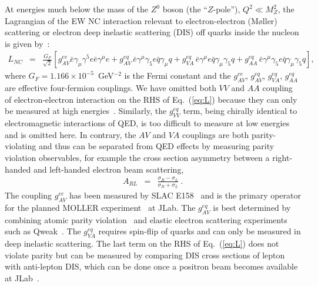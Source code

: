At energies much below the mass of the $Z^0$ boson (the ``$Z$-pole''), $Q^2\ll M_Z^2$, the Lagrangian of the EW NC interaction relevant to electron-electron (M\o ller) scattering or electron deep inelastic scattering (DIS) off quarks inside the nucleon is given by~\cite{Zyla:2020zbs}:
\begin{eqnarray}
L_{NC} &=& \frac{G_F}{\sqrt{2}} \left[ g_{AV}^{ee}\bar e\gamma_\mu\gamma^5 e\bar e\gamma^\mu e+ 
g_{AV}^{eq} \, \bar e\gamma^\mu\gamma_5 e \bar q\gamma_\mu q 
+ g_{VA}^{eq} \, \bar e\gamma^\mu e \bar q\gamma_\mu \gamma_5 q + 
g_{AA}^{eq} \, \bar e\gamma^\mu \gamma_5 e \bar q\gamma_\mu \gamma_5 q \right], \label{eq:L}
\end{eqnarray}
where $G_F=1.166\times 10^{-5}$~GeV$^{-2}$ is the Fermi constant and the $g^{ee}_{AV}$, $g^{eq}_{AV}$, $g^{eq}_{VA}$, $g^{eq}_{AA}$ are effective four-fermion couplings. 
We have omitted both $VV$ and $AA$ coupling of electron-electron interaction on the RHS of Eq.~(\ref{eq:L}) because they can only be measured at high energies~\cite{ALEPH:2005ab,Schael:2013ita}. Similarly, the $g_{VV}^{eq}$ term, being chirally identical to electromagnetic interactions of QED, is too difficult to measure at low energies and is omitted here. 
In contrary, the $AV$ and $VA$ couplings are both parity-violating and thus can be separated from QED effects by measuring parity violation observables, for example the cross section asymmetry between a right-handed and left-handed electron beam scattering, 
\begin{eqnarray}
  A_{RL} &=& \frac{\sigma_R-\sigma_L}{\sigma_R+\sigma_L}~. 
\end{eqnarray}
%
The coupling $g_{AV}^{ee}$ has been measured by SLAC E158~\cite{Anthony:2005pm} and is the primary operator for the planned MOLLER experiment~\cite{Benesch:2014bas} at JLab. 
The $g_{AV}^{eq}$ is best determined by combining atomic parity violation~\cite{Wood:1997zq,Guena:2005uj,Toh:2019iro} and elastic electron scattering experiments such as Qweak~\cite{Androic:2013rhu,Androic:2018kni}.
%
The $g_{VA}^{eq}$ requires spin-flip of quarks and can only be measured in deep inelastic scattering. 
The last term on the RHS of Eq.~(\ref{eq:L}) does not violate parity but can be measured by comparing DIS cross sections of lepton with anti-lepton DIS, which can be done once a positron beam becomes available at JLab~\cite{Zheng:2021hcf}. 


